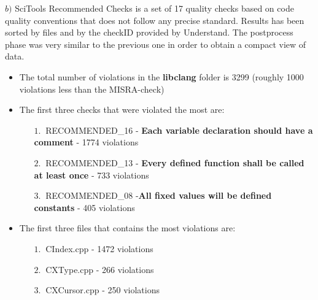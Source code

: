 \hspace{-0.6cm} \textbf{$b)$}  
SciTools Recommended Checks is a set of 17 quality checks based on code quality conventions that does not follow any precise standard.\newline
Results has been sorted by files and by the checkID provided by Understand. The postprocess phase was very similar to the previous one in order to obtain a compact view of data.\newline

\begin{itemize}
	\item The total number of violations in the \textbf{libclang} folder is 3299 (roughly 1000 violations less than the MISRA-check)
	\item The first three checks that were violated the most are:
	\begin{itemize}
		\item[$1.\:$] RECOMMENDED\_16 - \textbf{Each variable declaration should have a comment} - 1774 violations
		\item[$2.\:$] RECOMMENDED\_13 - \textbf{Every defined function shall be called at least once} - 733 violations
		\item[$3.\:$] RECOMMENDED\_08 -\textbf{All fixed values will be defined constants} - 405 violations
	\end{itemize}
	\item The first three files that contains the most violations are:
		\begin{itemize}
		\item[$1.\:$] CIndex.cpp - 1472 violations
		\item[$2.\:$] CXType.cpp - 266 violations
		\item[$3.\:$] CXCursor.cpp - 250 violations
	\end{itemize}
\end{itemize}

